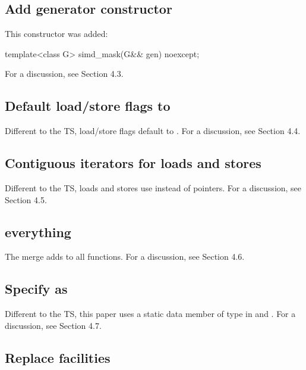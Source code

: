 \subsection{Add  generator constructor}

This constructor was added:
\begin{wgText}
\begin{itemdecl}
template<class G> simd_mask(G&& gen) noexcept;
\end{itemdecl}
\end{wgText}

For a discussion, see  Section 4.3.

\subsection{Default load/store flags to }

Different to the TS, load/store flags default to .
For a discussion, see  Section 4.4.

\subsection{Contiguous iterators for loads and stores}\label{sec:contiguousItLoadStore}

Different to the TS, loads and stores use  instead of pointers.
For a discussion, see  Section 4.5.

\subsection{ everything}
The merge adds  to all functions.
For a discussion, see  Section 4.6.

\subsection{Specify  as }

Different to the TS, this paper uses a static data member  of type
\std{} in \simd and \mask.
For a discussion, see  Section 4.7.

\subsection{Replace  facilities}


